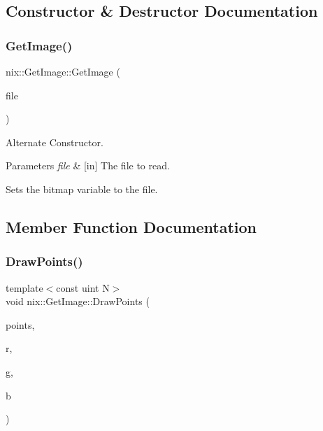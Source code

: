 \subsection{Constructor \& Destructor Documentation}
\mbox{\label{classnix_1_1GetImage_aa56441c4e8c2ad40725e4ae3d4a20976}} 
\subsubsection{\texorpdfstring{Get\+Image()}{GetImage()}}
{\footnotesize\ttfamily nix\+::\+Get\+Image\+::\+Get\+Image (\begin{DoxyParamCaption}\item[{string \&}]{file }\end{DoxyParamCaption})}



Alternate Constructor. 


\begin{DoxyParams}{Parameters}
{\em file} & \mbox{[}in\mbox{]} The file to read.\\
\hline
\end{DoxyParams}
Sets the bitmap variable to the file. 

\subsection{Member Function Documentation}
\mbox{\label{classnix_1_1GetImage_a85a80ac19ce8cbb20ef873554f728535}} 
\subsubsection{\texorpdfstring{Draw\+Points()}{DrawPoints()}}
{\footnotesize\ttfamily template$<$const uint N$>$ \\
void nix\+::\+Get\+Image\+::\+Draw\+Points (\begin{DoxyParamCaption}\item[{\hyperlink{classutil_1_1ArrayList}{Array\+List}$<$ \hyperlink{classutil_1_1Point}{Point}$<$ decimal $>$, N $>$ \&}]{points,  }\item[{byte}]{r,  }\item[{byte}]{g,  }\item[{byte}]{b }\end{DoxyParamCaption})\hspace{0.3cm}{\ttfamily [inline]}}



